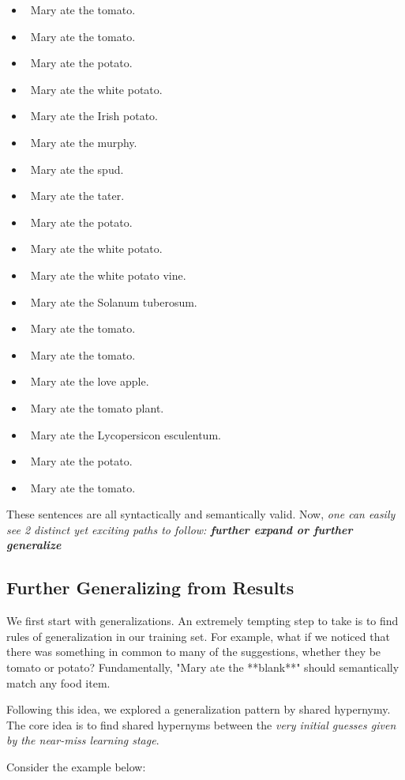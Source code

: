 \documentclass{article}[12pt]
\theoremstyle{definition}
\begin{document}
\begin{itemize}
\item\ Mary ate the tomato.
\item\ Mary ate the tomato.
\item\ Mary ate the potato.
\item\ Mary ate the white potato.
\item\ Mary ate the Irish potato.
\item\ Mary ate the murphy.
\item\ Mary ate the spud.
\item\ Mary ate the tater.
\item\ Mary ate the potato.
\item\ Mary ate the white potato.
\item\ Mary ate the white potato vine.
\item\ Mary ate the Solanum tuberosum.
\item\ Mary ate the tomato.
\item\ Mary ate the tomato.
\item\ Mary ate the love apple.
\item\ Mary ate the tomato plant.
\item\ Mary ate the Lycopersicon esculentum.
\item\ Mary ate the potato.
\item\ Mary ate the tomato.
\end{itemize}

These sentences are all syntactically and semantically valid. Now, \emph{one can easily see 2 distinct yet exciting paths to follow: \textbf{further expand or further generalize}} \\

\subsection{Further Generalizing from Results}
We first start with generalizations. An extremely tempting step to take is to find rules of generalization in our training set. For example, what if we noticed that there was something in common to many of the suggestions, whether they be tomato or potato? Fundamentally, "Mary ate the **blank**" should semantically match any food item.

Following this idea, we explored a generalization pattern by shared hypernymy. The core idea is to find shared hypernyms between the \emph{very initial guesses given by the near-miss learning stage}. 

Consider the example below: 
\end{document}
